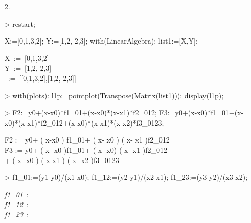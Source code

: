 \begin{itemize}
\item[2.]

\begin{MapleInput}
> restart;

X:=[0,1,3,2];
Y:=[1,2,-2,3];
with(LinearAlgebra):
list1:=[X,Y];
\end{MapleInput}

\begin{MapleOutputGather}
\displaystyle X\, := \,[0,1,3,2] \notag \\
\displaystyle Y\, := \,[1,2,-2,3] \notag \\
\, := \,[[0,1,3,2],[1,2,-2,3]] \notag
\end{MapleOutputGather}

\begin{MapleInput}
> with(plots):
l1p:=pointplot(Transpose(Matrix(list1))):
display(l1p);
\end{MapleInput}


\begin{MapleInput}
> F2:=y0+(x-x0)*f1_01+(x-x0)*(x-x1)*f2_012;
F3:=y0+(x-x0)*f1_01+(x-x0)*(x-x1)*f2_012+(x-x0)*(x-x1)*(x-x2)*f3_0123;
\end{MapleInput}

\begin{MapleOutputGather}
F2 := y0+ \left( x-x0 \right) f1\_01+ \left( x- x0 \right)  \left( x- x1 \right)f2\_012 \notag \\
F3 := y0+ \left( x- x0 \right)f1\_01+ \left( x- x0\right)  \left( x- x1 \right)f2\_012\notag \\
+ \left( x- x0 \right)  \left( x-x1 \right)  \left( x- x2 \right)f3\_0123 \notag
\end{MapleOutputGather}

\begin{MapleInput}
> f1_01:=(y1-y0)/(x1-x0);
f1_12:=(y2-y1)/(x2-x1);
f1_23:=(y3-y2)/(x3-x2);
\end{MapleInput}

\begin{MapleOutputGather}
{\it f1\_01}\, := \,{} \notag \\
{\it f1\_12}\, := \,{}\notag \\
{\it f1\_23}\, := \,{}\notag 
\end{MapleOutputGather}


\end{itemize}

